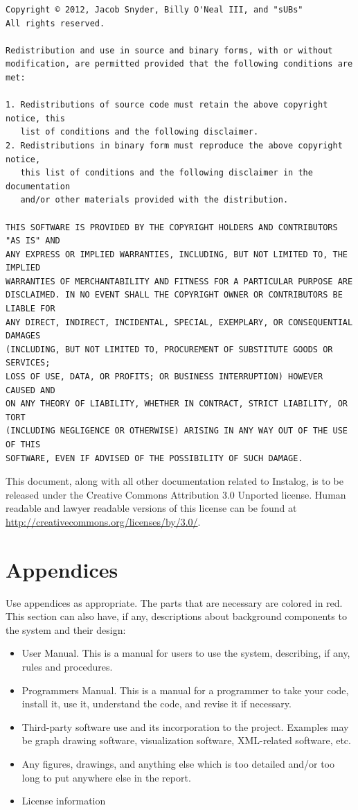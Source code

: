 \documentclass[letterpaper,12pt]{article}
\begin{document}
\begin{verbatim}
Copyright © 2012, Jacob Snyder, Billy O'Neal III, and "sUBs"
All rights reserved.

Redistribution and use in source and binary forms, with or without
modification, are permitted provided that the following conditions are met: 

1. Redistributions of source code must retain the above copyright notice, this
   list of conditions and the following disclaimer. 
2. Redistributions in binary form must reproduce the above copyright notice,
   this list of conditions and the following disclaimer in the documentation
   and/or other materials provided with the distribution. 

THIS SOFTWARE IS PROVIDED BY THE COPYRIGHT HOLDERS AND CONTRIBUTORS "AS IS" AND
ANY EXPRESS OR IMPLIED WARRANTIES, INCLUDING, BUT NOT LIMITED TO, THE IMPLIED
WARRANTIES OF MERCHANTABILITY AND FITNESS FOR A PARTICULAR PURPOSE ARE
DISCLAIMED. IN NO EVENT SHALL THE COPYRIGHT OWNER OR CONTRIBUTORS BE LIABLE FOR
ANY DIRECT, INDIRECT, INCIDENTAL, SPECIAL, EXEMPLARY, OR CONSEQUENTIAL DAMAGES
(INCLUDING, BUT NOT LIMITED TO, PROCUREMENT OF SUBSTITUTE GOODS OR SERVICES;
LOSS OF USE, DATA, OR PROFITS; OR BUSINESS INTERRUPTION) HOWEVER CAUSED AND
ON ANY THEORY OF LIABILITY, WHETHER IN CONTRACT, STRICT LIABILITY, OR TORT
(INCLUDING NEGLIGENCE OR OTHERWISE) ARISING IN ANY WAY OUT OF THE USE OF THIS
SOFTWARE, EVEN IF ADVISED OF THE POSSIBILITY OF SUCH DAMAGE.
\end{verbatim}

This document, along with all other documentation related to Instalog,  is to be
released under the Creative Commons Attribution 3.0 Unported license. Human
readable and lawyer readable versions of this license can be found at
\url{http://creativecommons.org/licenses/by/3.0/}.

\newpage



\section{Appendices} \label{appendices}
Use appendices as appropriate. The parts that are necessary are colored in red.
This section can also have, if any, descriptions about background components to
the system and their design:

\begin{itemize}
  \item User Manual.  This is a manual for users to use the system, describing,
  if any, rules and procedures.
  \item Programmers Manual.  This is a manual for a programmer to take your
  code, install it, use it, understand the code, and revise it if necessary. 
  \item Third-party software use and its incorporation to the project.  Examples
  may be graph drawing software, visualization software, XML-related software,
  etc.
  \item Any figures, drawings, and anything else which is too detailed and/or
  too long to put anywhere else in the report. 
  \item License information
\end{itemize}

\newpage



{} 


\newpage
\end{document}
